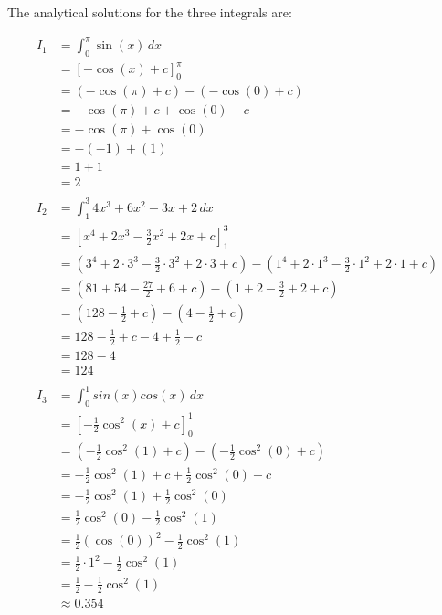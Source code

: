 The analytical solutions for the three integrals are:

\begin{align}
I_1
&=\int_0^\pi \sin(x)\,dx \\
&= \left[-\cos(x) + c\right]_0^\pi \\
&= (-\cos(\pi) + c) - (-\cos(0) + c) \\
&= -\cos(\pi) + c + \cos(0) - c \\
&= -\cos(\pi) + \cos(0) \\
&= -(-1) + (1) \\
&= 1 + 1 \\
&= 2 \\
\\
I_2
&=\int_1^3 4x^3+6x^2-3x+2\,dx \\
&= \left[x^4+2x^3-\frac{3}{2}x^2 + 2x + c\right]_1^3 \\
&= (3^4+2\cdot 3^3-\frac{3}{2}\cdot 3^2 + 2\cdot 3 + c) - (1^4+2\cdot 1^3-\frac{3}{2}\cdot 1^2 + 2\cdot 1 + c) \\
&= (81+54-\frac{27}{2} + 6 + c) - (1+2-\frac{3}{2} + 2 + c) \\
&= (128-\frac{1}{2} + c) - (4-\frac{1}{2} + c) \\
&= 128-\frac{1}{2} + c - 4+\frac{1}{2} - c \\
&= 128 - 4 \\
&= 124 \\
\\
I_3
&=\int_0^1 sin(x)cos(x)\,dx \\
&= \left[-\frac{1}{2} \cos^2(x) + c\right]_0^1 \\
&= (-\frac{1}{2} \cos^2(1) + c) - (-\frac{1}{2} \cos^2(0) + c) \\
&= -\frac{1}{2} \cos^2(1) + c +\frac{1}{2} \cos^2(0) - c \\
&= -\frac{1}{2} \cos^2(1) + \frac{1}{2} \cos^2(0) \\
&= \frac{1}{2} \cos^2(0) - \frac{1}{2} \cos^2(1) \\
&= \frac{1}{2} (\cos(0))^2 - \frac{1}{2} \cos^2(1) \\
&= \frac{1}{2} \cdot 1^2 - \frac{1}{2} \cos^2(1) \\
&= \frac{1}{2} - \frac{1}{2} \cos^2(1) \\
&\approx 0.354
\end{align}

%    
%    
%    

